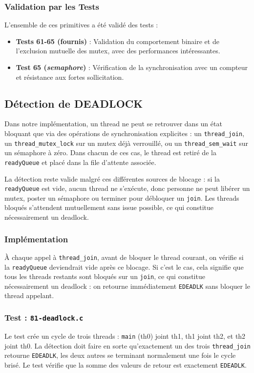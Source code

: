 \subsubsection{Validation par les Tests}
L'ensemble de ces primitives a été validé des tests :
\begin{itemize}
    \item \textbf{Tests 61-65 (fournis)} : Validation du comportement binaire et de l'exclusion mutuelle des mutex, 
    avec des performances intéressantes.
    \item \textbf{Test 65 (\textit{semaphore})} : Vérification de la synchronisation avec un compteur et résistance aux fortes sollicitation.
\end{itemize}



\subsection{Détection de DEADLOCK}

Dans notre implémentation, un thread ne peut se retrouver dans un état bloquant
que via des opérations de synchronisation explicites : un \texttt{thread\_join},
un \texttt{thread\_mutex\_lock} sur un mutex déjà verrouillé, ou un
\texttt{thread\_sem\_wait} sur un sémaphore à zéro. Dans chacun de ces cas,
le thread est retiré de la \texttt{readyQueue} et placé dans la file d'attente
associée.

La détection reste valide malgré ces différentes sources de blocage : si la
\texttt{readyQueue} est vide, aucun thread ne s'exécute, donc personne ne peut
libérer un mutex, poster un sémaphore ou terminer pour débloquer un
\texttt{join}. Les threads bloqués s'attendent mutuellement sans issue possible,
ce qui constitue nécessairement un deadlock.

\subsubsection{Implémentation}

À chaque appel à \texttt{thread\_join}, avant de bloquer le thread courant,
on vérifie si la \texttt{readyQueue} deviendrait vide après ce blocage. Si c'est
le cas, cela signifie que tous les threads restants sont bloqués sur un
\texttt{join}, ce qui constitue nécessairement un deadlock : on retourne
immédiatement \texttt{EDEADLK} sans bloquer le thread appelant.

\subsubsection{Test : \texttt{81-deadlock.c}}

Le test crée un cycle de trois threads : \texttt{main} (th0) joint th1,
th1 joint th2, et th2 joint th0. La détection doit faire en sorte qu'exactement
un des trois \texttt{thread\_join} retourne \texttt{EDEADLK}, les deux autres
se terminant normalement une fois le cycle brisé. Le test vérifie que la somme
des valeurs de retour est exactement \texttt{EDEADLK}.